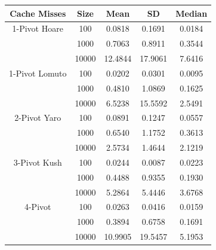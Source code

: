 \documentclass{article}
\begin{document}
\begin{center}
    \begin{tabular}{ |c c | c c c| }
        \hline
        Cache Misses    & Size     & Mean         & SD        & Median \\
        \hline
        1-Pivot Hoare   & 100      & 0.0818       & 0.1691    & 0.0184 \\
                        & 1000     & 0.7063       & 0.8911    & 0.3544 \\
                        & 10000    & 12.4844      & 17.9061   & 7.6416 \\
        \hline
        1-Pivot Lomuto  & 100      & 0.0202       & 0.0301    & 0.0095 \\
                        & 1000     & 0.4810       & 1.0869    & 0.1625 \\
                        & 10000    & 6.5238       & 15.5592   & 2.5491 \\
        \hline
        2-Pivot Yaro    & 100      & 0.0891       & 0.1247    & 0.0557 \\
                        & 1000     & 0.6540       & 1.1752    & 0.3613 \\
                        & 10000    & 2.5734       & 1.4644    & 2.1219 \\
        \hline
        3-Pivot Kush    & 100      & 0.0244       & 0.0087    & 0.0223 \\
                        & 1000     & 0.4488       &	0.9355    & 0.1930 \\
                        & 10000    & 5.2864       & 5.4446    & 3.6768 \\
        \hline
        4-Pivot         & 100      & 0.0263       &	0.0416    &	0.0159 \\
                        & 1000     & 0.3894       &	0.6758    & 0.1691 \\
                        & 10000    & 10.9905      & 19.5457   & 5.1953 \\
        \hline
    \end{tabular}
\end{center}
\end{document}
